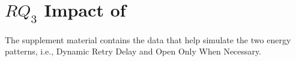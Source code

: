 \section{\texorpdfstring{$RQ_3$}: Impact of \EPS}
The supplement material contains the data that help simulate the two energy patterns, i.e., Dynamic Retry Delay and Open Only When Necessary.

%
%

%
%

